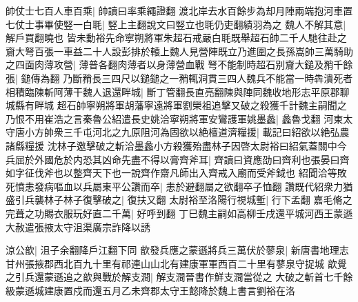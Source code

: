 帥仗士七百人車百乘|{
	帥讀曰率乘繩證翻}
渡北岸去水百餘步為却月陣兩端抱河車置七仗士事畢使竪一白毦|{
	竪上主翻說文曰竪立也毦仍吏翻績羽為之}
魏人不解其意|{
	解戶買翻曉也}
皆未動裕先命寧朔將軍朱超石戒嚴白毦既舉超石帥二千人馳往赴之齎大弩百張一車益二十人設彭排於轅上魏人見營陣既立乃進圍之長孫嵩帥三萬騎助之四面肉薄攻營|{
	薄普各翻肉薄者以身薄營血戰}
弩不能制時超石别齎大鎚及矟千餘張|{
	鎚傳為翻}
乃斷矟長三四尺以鎚鎚之一矟輒洞貫三四人魏兵不能當一時犇潰死者相積臨陳斬阿薄干魏人退還畔城|{
	斷丁管翻長直亮翻陳與陣同魏收地形志平原郡聊城縣有畔城}
超石帥寧朔將軍胡藩寧遠將軍劉榮祖追擊又破之殺獲千計魏主嗣聞之乃恨不用崔浩之言秦魯公紹遣長史姚洽寧朔將軍安鸞護軍姚墨蠡|{
	蠡魯戈翻}
河東太守唐小方帥衆三千屯河北之九原阻河為固欲以絶檀道濟糧援|{
	載記曰紹欲以絶弘農諸縣糧援}
沈林子邀擊破之斬洽墨蠡小方殺獲殆盡林子因啓太尉裕曰紹氣蓋關中今兵屈於外國危於内恐其凶命先盡不得以膏齊斧耳|{
	齊讀曰資應劭曰齊利也張晏曰齊如字征伐斧也以整齊天下也一說齊作齋凡師出入齊戒入廟而受斧鉞也}
紹聞洽等敗死憤恚發病嘔血以兵屬東平公讚而卒|{
	恚於避翻屬之欲翻卒子恤翻}
讚既代紹衆力猶盛引兵襲林子林子復擊破之|{
	復扶又翻}
太尉裕至洛陽行視城塹|{
	行下孟翻}
嘉毛脩之完葺之功賜衣服玩好直二千萬|{
	好呼到翻}
丁巳魏主嗣如高柳壬戌還平城河西王蒙遜大赦遣張掖太守沮渠廣宗詐降以誘

涼公歆|{
	沮子余翻降戶江翻下同}
歆發兵應之蒙遜將兵三萬伏於蓼泉|{
	新唐書地理志甘州張掖郡西北百九十里有祁連山山北有建康軍軍西百二十里有蓼泉守捉城}
歆覺之引兵還蒙遜追之歆與戰於解支澗|{
	解支澗晉書作鮮支澗當從之}
大破之斬首七千餘級蒙遜城建康置戍而還五月乙未齊郡太守王懿降於魏上書言劉裕在洛

